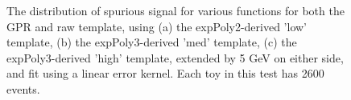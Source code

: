 \begin{figure} 
\begin{center}

\caption{The distribution of spurious signal for various functions for both the GPR and raw template, using (a) the expPoly2-derived 'low' template, (b) the expPoly3-derived 'med' template, (c) the expPoly3-derived 'high' template, extended by 5 GeV on either side, and fit using a linear error kernel. Each toy in this test has 2600 events.}
\label{fig:linearkernel_lowpt_2600_noSig}
\end{center}
\end{figure}

